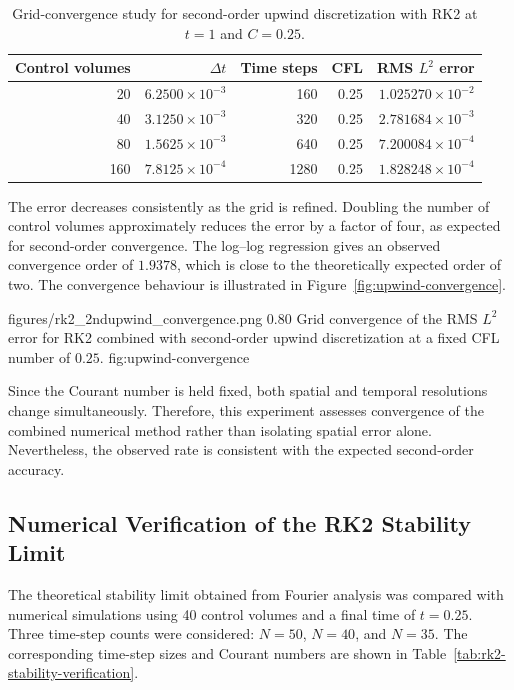 \begin{table}[!htbp]
    \centering
    \caption{Grid-convergence study for second-order upwind discretization with RK2 at $t=1$ and $C=0.25$.}
    \label{tab:upwind-grid-convergence}
    \small
    \begin{tabular}{r r r r r}
        \toprule
        Control volumes & $\Delta t$ & Time steps & CFL & RMS $L^2$ error \\
        \midrule
        20  & $6.2500\times10^{-3}$ & 160  & 0.25 & $1.025270\times10^{-2}$ \\
        40  & $3.1250\times10^{-3}$ & 320  & 0.25 & $2.781684\times10^{-3}$ \\
        80  & $1.5625\times10^{-3}$ & 640  & 0.25 & $7.200084\times10^{-4}$ \\
        160 & $7.8125\times10^{-4}$ & 1280 & 0.25 & $1.828248\times10^{-4}$ \\
        \bottomrule
    \end{tabular}
\end{table}

The error decreases consistently as the grid is refined. Doubling the number of control volumes approximately reduces the error by a factor of four, as expected for second-order convergence. The log--log regression gives an observed convergence order of $1.9378$, which is close to the theoretically expected order of two. The convergence behaviour is illustrated in Figure~\ref{fig:upwind-convergence}.

\resultfigure
    {figures/rk2_2ndupwind_convergence.png}
    {0.80}
    {Grid convergence of the RMS $L^2$ error for RK2 combined with second-order upwind discretization at a fixed CFL number of $0.25$.}
    {fig:upwind-convergence}

Since the Courant number is held fixed, both spatial and temporal resolutions change simultaneously. Therefore, this experiment assesses convergence of the combined numerical method rather than isolating spatial error alone. Nevertheless, the observed rate is consistent with the expected second-order accuracy.

\subsection{Numerical Verification of the RK2 Stability Limit}
\label{subsec:rk2-stability-verification}

The theoretical stability limit obtained from Fourier analysis was compared with numerical simulations using 40 control volumes and a final time of $t=0.25$. Three time-step counts were considered: $N=50$, $N=40$, and $N=35$. The corresponding time-step sizes and Courant numbers are shown in Table~\ref{tab:rk2-stability-verification}.

